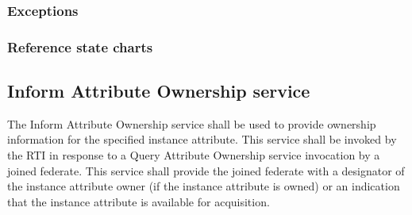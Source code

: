 \begin{compactstdpage}
    \subsubsection{Exceptions}



    \subsubsection{Reference state charts}



    \subsection{Inform Attribute Ownership \rtiinitiated{} service}


    The Inform Attribute Ownership \rtiinitiated{} service shall be used to provide ownership information for the specified instance attribute. This service shall be invoked by the RTI in response to a Query Attribute Ownership service invocation by a joined federate. This service shall provide the joined federate with a designator of the instance attribute owner (if the instance attribute is owned) or an indication that the instance attribute is available for acquisition.

\end{compactstdpage}

\clearpage

